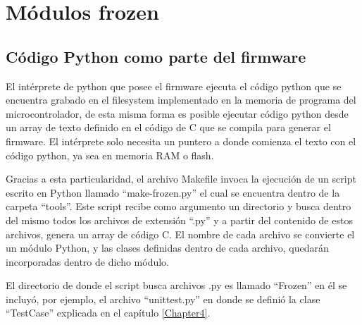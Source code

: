 
\chapter{Módulos frozen} %

\label{AppendixB} %

\section{Código Python como parte del firmware}

El intérprete de python que posee el firmware ejecuta el código python que se encuentra grabado en el filesystem implementado en la memoria de programa del microcontrolador, de esta misma forma es posible ejecutar código python desde un array de texto definido en el código de C que se compila para generar el firmware. El intérprete solo necesita un puntero a donde comienza el texto con el código python, ya sea en memoria RAM o flash.

Gracias a esta particularidad, el archivo Makefile invoca la ejecución de un script escrito en Python llamado “make-frozen.py” el cual se encuentra dentro de la carpeta “tools”. Este script recibe como argumento un directorio y busca dentro del mismo todos los archivos de extensión “.py” y a partir del contenido de estos archivos, genera un array de código C. El nombre de cada archivo se convierte el un módulo Python, y las clases definidas dentro de cada archivo, quedarán incorporadas dentro de dicho módulo.

El directorio de donde el script busca archivos .py es llamado “Frozen” en él se incluyó, por ejemplo, el archivo “unittest.py” en donde se definió la clase “TestCase” explicada en el capítulo \ref{Chapter4}.


